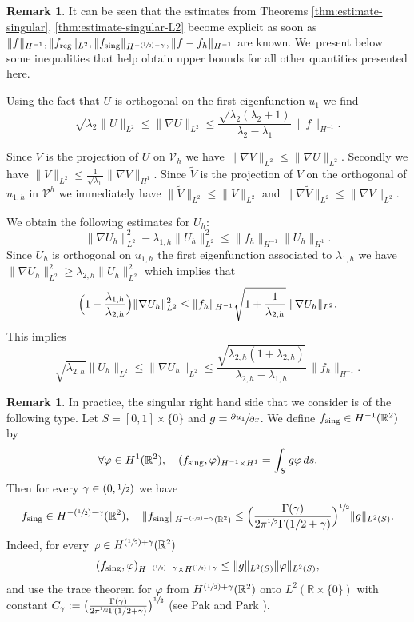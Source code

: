 \documentclass[JEP,XML,SOM,Unicode,ThmDefs,NoFloatCountersInSection,published]{cedram}
\newcommand{\Psfrac}[2]{(\sfrac{#1}{#2})}
\theoremstyle{plain}
\theoremstyle{definition}
\newtheorem{rem}[thm]{Remark}
\newcommand{\reg}{\textup{reg}}
\newcommand{\sing}{\textup{sing}}
\def\R{\mathbb{R}}
\newcommand{\vphi}{\varphi}
\newcommand{\lb}{\lambda}
\begin{document}
\begin{rem}
\rm
It can be seen that the estimates from Theorems \ref{thm:estimate-singular}, \ref{thm:estimate-singular-L2} become explicit as soon as $\|f\|_{H^{-1}}, \|f_{\reg}\|_{L^2}, \|f_{\sing}\|_{H^{-\Psfrac{1}{2}-\gamma}}, \|f-f_h\|_{H^{-1}}$ are known. We~present below some inequalities that help obtain upper bounds for all other quantities presented here.

Using the fact that $U$ is orthogonal on the first eigenfunction $u_1$ we find
\[
\sqrt{\lambda_2}\|U\|_{L^2}\le \|\nabla U\|_{L^2}\le \frac{\sqrt{\lb_2(\lb_2+1)}}{\lb_2-\lb_1}\,\|f\|_{H^{-1}}.
\]

Since $V$ is the projection of $U$ on $\mathcal V_h$ we have $\|\nabla V\|_{L^2} \leq \|\nabla U\|_{L^2}$. Secondly we have $\|V\|_{L^2} \leq \frac{1}{\sqrt{\lambda_1}} \|\nabla V\|_{H^1}$. Since $\tilde V$ is the projection of $V$ on the orthogonal of $u_{1,h}$ in $\mathcal V^h$ we immediately have $\|\tilde V\|_{L^2} \leq \|V\|_{L^2}$ and $\|\nabla \tilde V\|_{L^2} \leq \|\nabla V\|_{L^2}$.

We obtain the following estimates for $U_h$:
\[
\|\nabla U_h\|^2_{L^2}-\lambda_{1,h} \|U_h\|_{L^2}^2 \leq \|f_h\|_{H^{-1}}\|U_h\|_{H^1}.
\]
Since $U_h$ is orthogonal on $u_{1,h}$ the first eigenfunction associated to $\lambda_{1,h}$ we have $\|\nabla U_h\|_{L^2}^2 \geq \lambda_{2,h} \|U_h\|_{L^2}^2$ which implies that
\[
\Bigl(1-\frac{\lambda_{1,h}}{\lambda_{2,h}}\Bigr) \|\nabla U_h\|^2_{L^2} \leq \|f_h\|_{H^{-1}} \sqrt{1+\frac{1}{\lambda_{2,h}}}\; \|\nabla U_h\|_{L^2}.
\]
This implies
\[
\sqrt{\lambda_{2,h}}\|U_h\|_{L^2} \leq \|\nabla U_h\|_{L^2} \leq \frac{\sqrt{\lambda_{2,h}(1+\lambda_{2,h})}}{\lambda_{2,h}-\lambda_{1,h}}\, \|f_h\|_{H^{-1}}.
\]
\label{rem:needed-estimates}
\end{rem}

\begin{rem}
In practice, the singular right hand side that we consider is of the following type. Let $S= [0, 1]\times \{0\}$ and $g= \sfrac{\partial u_1}{\partial x} $. We define $f_{\sing}\in H^{-1}(\R^2)$ by
\[
\forall \vphi \in H^1(\R^2),\quad (f _{\sing}, \vphi)_{H^{-1}\times H^1} = \int_S g \vphi\, ds.
\]
Then for every $\gamma \in (0, \sfrac 12)$ we have
\[
f_{\sing} \in H^{-\Psfrac 12 -\gamma} (\R^2), \quad \|f_{\sing}\|_{H^{-\Psfrac 12 -\gamma} (\R^2)} \le
\Bigl (\frac{\Gamma(\gamma)}{2\pi^{\sfrac 12} \Gamma(1/2+\gamma)}\Bigr)^{\sfrac 12} \|g\|_{L^2(S)}.
\]
Indeed, for every $\vphi\in H^{\Psfrac 12 +\gamma} (\R^2)$
\[
(f_{\sing}, \vphi)_{H^{-\Psfrac 12-\gamma}\times H^{\Psfrac 12 +\gamma}}\le \|g\|_{L^2(S)} \|\vphi\|_{L^2(S)},
\]
and use the trace theorem for $\vphi$ from
$H^{\Psfrac 12 +\gamma} (\R^2)$ onto $L^2(\R\times\{0\})$ with constant $C_\gamma := \big (\frac{\Gamma(\gamma)}{2\pi^{\sfrac 12} \Gamma(1/2+\gamma)}\big)^{\sfrac 12}$ (see Pak and Park \cite{PaPa11}).
\label{rem:c-gamma}
\end{rem}
\end{document}
